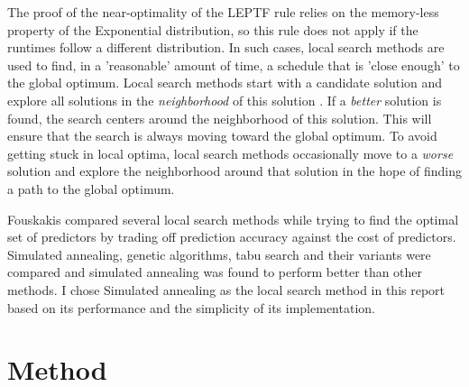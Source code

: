 \documentclass[12pt]{report}
\begin{document}
The proof of the near-optimality of the LEPTF rule relies on the memory-less property of the Exponential distribution, so this rule does not apply if the runtimes follow a different distribution.
In such cases, local search methods are used to find, in a 'reasonable' amount of time, a schedule that is 'close enough' to the global optimum.
Local search methods start with a candidate solution and explore all solutions in the \textit{neighborhood} of this solution \cite{Glass1994}.
If a \textit{better} solution is found, the search centers around the neighborhood of this solution.
This will ensure that the search is always moving toward the global optimum.
To avoid getting stuck in local optima, local search methods occasionally move to a \textit{worse} solution and explore the neighborhood around that solution in the hope of finding a path to the global optimum.

Fouskakis \cite{Fouskakis2001} compared several local search methods while trying to find the optimal set of predictors by trading off prediction accuracy against the cost of predictors. 
Simulated annealing, genetic algorithms, tabu search and their variants were compared and simulated annealing was found to perform better than other methods.
I chose Simulated annealing as the local search method in this report based on its performance and the simplicity of its implementation.

\section{Method}
\end{document}
